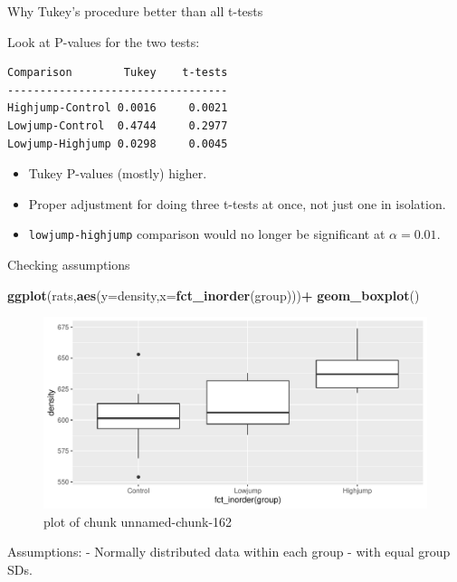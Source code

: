 \documentclass[ignorenonframetext,]{beamer}
\newenvironment{Shaded}{\begin{snugshade}}{\end{snugshade}}
\newcommand{\DataTypeTok}[1]{\textcolor[rgb]{0.13,0.29,0.53}{#1}}
\newcommand{\KeywordTok}[1]{\textcolor[rgb]{0.13,0.29,0.53}{\textbf{#1}}}
\newcommand{\NormalTok}[1]{#1}
\newcommand{\OperatorTok}[1]{\textcolor[rgb]{0.81,0.36,0.00}{\textbf{#1}}}
\providecommand{\tightlist}{%
  \setlength{\itemsep}{0pt}\setlength{\parskip}{0pt}}
\begin{document}
\begin{frame}[fragile]{Why Tukey's procedure better than all t-tests}
\protect\hypertarget{why-tukeys-procedure-better-than-all-t-tests}{}

Look at P-values for the two tests:

\begin{verbatim}
Comparison        Tukey    t-tests
----------------------------------
Highjump-Control 0.0016     0.0021
Lowjump-Control  0.4744     0.2977
Lowjump-Highjump 0.0298     0.0045
\end{verbatim}

\begin{itemize}
\tightlist
\item
  Tukey P-values (mostly) higher.
\item
  Proper adjustment for doing three t-tests at once, not just one in
  isolation.
\item
  \texttt{lowjump-highjump} comparison would no longer be significant at
  \(\alpha = 0.01\).
\end{itemize}

\end{frame}

\begin{frame}[fragile]{Checking assumptions}
\protect\hypertarget{checking-assumptions}{}

\begin{Shaded}
\begin{Highlighting}[]
\KeywordTok{ggplot}\NormalTok{(rats,}\KeywordTok{aes}\NormalTok{(}\DataTypeTok{y=}\NormalTok{density,}\DataTypeTok{x=}\KeywordTok{fct_inorder}\NormalTok{(group)))}\OperatorTok{+}
\KeywordTok{geom_boxplot}\NormalTok{()}
\end{Highlighting}
\end{Shaded}

\begin{figure}
\centering
\includegraphics{figure/unnamed-chunk-162-1.pdf}
\caption{plot of chunk unnamed-chunk-162}
\end{figure}

Assumptions: - Normally distributed data within each group - with equal
group SDs.

\end{frame}
\end{document}

